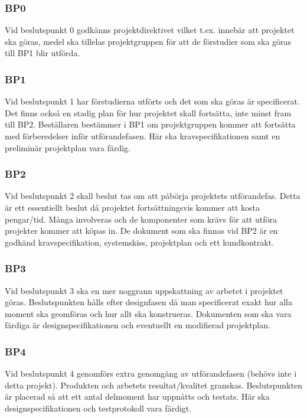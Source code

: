 \documentclass[projektplan/plan.tex]{subfiles}
\begin{document}
\subsubsection*{BP0} Vid beslutspunkt 0 godkänns projektdirektivet vilket t.ex. innebär att
projektet ska göras, medel ska tillelas projektgruppen för att de förstudier
som ska göras till  BP1 blir utförda.

\subsubsection*{BP1} 
Vid beslutspunkt 1 har förstudierna utförts och det som ska göras är specificerat. Det
finns också en stadig plan för hur projektet skall fortsätta, inte minst fram
till BP2. Beställaren bestämmer i BP1 om projektgruppen kommer att fortsätta
med förberedelser inför utförandefasen. Här ska kravspecifikationen samt en
preliminär projektplan vara färdig.

\subsubsection*{BP2}
Vid beslutspunkt 2 skall beslut tas om att påbörja projektets utförandefas. Detta är ett
essentiellt beslut då projektet fortsättningsvis kommer att kosta pengar/tid.
Många involveras och de komponenter som krävs för att utföra projekter kommer
att köpas in. De dokument som ska finnas vid BP2 är en godkänd
kravspecifikation, systemskiss, projektplan och ett kundkontrakt.

\subsubsection*{BP3}
Vid beslutspunkt 3 ska en mer noggrann uppskattning av arbetet i projektet
göras. Beslutspunkten hålls efter designfasen då man specificerat exakt hur
alla moment ska geomföras och hur allt ska konstrueras. Dokumenten som ska vara
färdiga är designspecifikationen och eventuellt en modifierad projektplan.

\subsubsection*{BP4}
Vid beslutspunkt 4 genomförs extra genomgång av utförandefasen (behövs inte i
detta projekt). Produkten och
arbetets resultat/kvalitet granskas. Beslutspunkten är placerad så att ett
antal delmoment har uppnåtts och testats. Här ska designspecifikationen och
testprotokoll vara färdigt.
\end{document}
